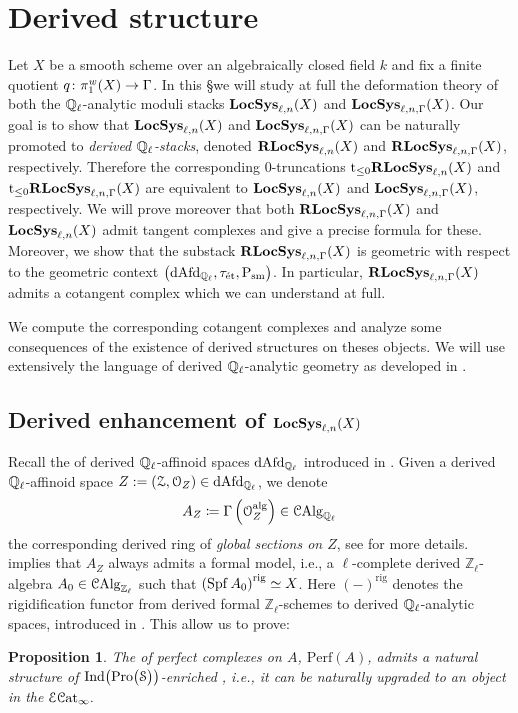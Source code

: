 \documentclass[10pt,a4paper]{amsart}
\numberwithin{equation}{subsection}
\theoremstyle{plain}
\newtheorem{prop}[theorem]{Proposition}
\theoremstyle{definition}
\theoremstyle{remark}
\numberwithin{equation}{section}
\begin{document}
\section{Derived structure} Let $X$ be a smooth scheme over an algebraically closed field $k$ and fix a finite quotient $q \colon \pi_1^w(X) \to \Gamma$.
In this \S we will study at full the deformation theory of both the $\mathbb{Q}_\ell$-analytic moduli stacks $\mathbf{LocSys}_{\ell, n}(X)$ and $\mathbf{LocSys}_{\ell, n, \Gamma}(X)$. Our goal is to show that $\mathbf{LocSys}_{\ell, n}(X)$ and
$\mathbf{LocSys}_{\ell, n, \Gamma}(X)$ can be naturally promoted to \emph{derived $ \mathbb{Q}_{\ell}$-stacks}, denoted $\mathbf R \mathbf{LocSys}_{\ell, n}(X)$ and $\mathbf R \mathbf{LocSys}_{\ell, n, \Gamma}(X)$, respectively. 
Therefore the corresponding $0$-truncations $\mathrm{t}_{\leq 0} \mathbf R \mathbf{LocSys}_{\ell, n}(X)$
and $\mathrm{t}_{\leq 0} \mathbf R \mathbf{LocSys}_{\ell, n, \Gamma}(X)$ are equivalent to $\mathbf{LocSys}_{\ell, n}(X)$ and $\mathbf{LocSys}_{\ell, n, \Gamma}(X)$, respectively. We will prove moreover that both $\mathbf R \mathbf{LocSys}_{\ell, n, \Gamma}(X)$ and $\mathbf{LocSys}_{\ell, n}(X)$ admit tangent complexes and give a precise formula for these. Moreover, we show that
the substack $\mathbf R \mathbf{LocSys}_{\ell, n, \Gamma}(X)$ is geometric with respect to the geometric context $\big( \mathrm{dAfd}_{\mathbb{Q}_\ell}, \tau_{\text{\'et}}, \mathrm P_{\mathrm{sm}} \big)$. In particular, $\mathbf R \mathbf{LocSys}_{\ell, n, \Gamma}(X)$ admits a cotangent complex which we can understand at full.


We compute the corresponding cotangent complexes and analyze some consequences of the existence of derived structures on theses objects.
We will use extensively the language of derived $\mathbb{Q}_{\ell}$-analytic geometry as developed in \cite{porta_der, porta_rep}.


\subsection{Derived enhancement of $\mathbf{LocSys}_{\ell, n}(X)$} Recall the \infcat of derived $\mathbb Q_\ell$-affinoid spaces $\mathrm{dAfd}_{\mathbb{Q}_\ell}$ introduced in \cite{porta_der}.
Given a derived $\mathbb Q_\ell$-affinoid space $Z : = (\mathcal Z, \mathcal{O}_Z) \in \mathrm{dAfd}_{\mathbb{Q}_\ell}$, we denote 
	\[
	A_Z \coloneqq \Gamma \left(  \mathcal{O}_Z^{\mathrm{alg}} \right) \in \mathcal{C}\mathrm{Alg}_{\mathbb{Q}_{\ell}}
	\]
the corresponding derived ring of \emph{global sections on $Z$}, see \cite[Theorem 3.1]{porta_hom} for more details.
\cite[Theorem 4.4.10]{me2} implies that $A_Z$ always admits a formal model, i.e., a $\ell$-complete derived
$\mathbb Z_{\ell}$-algebra $A_0 \in \mathcal{C}\mathrm{Alg}_{\mathbb Z_\ell}$ such that $\left( \operatorname{Spf} A_0 \right)^{\mathrm{rig}} \simeq X$. Here $(-)^{\mathrm{rig}}$ denotes the rigidification functor from derived formal $\mathbb Z_\ell$-schemes to derived
$\mathbb{Q}_\ell$-analytic spaces, introduced in \cite[\S 4]{me2}. This allow us to prove:


\begin{prop}{\cite[Proposition 4.3.6]{me1}} \label{prop:enr}
The \infcat of perfect complexes on $A$, $\mathrm{Perf}(A)$, admits a natural structure of
$\mathrm{Ind} \big( \mathrm{Pro} \big( \mathcal S \big) \big)$-enriched \infcat, i.e., it can be naturally upgraded to an object in the \infcat $\mathcal E \mathcal{C}\mathrm{at}_\infty .$
\end{prop}
\end{document}
